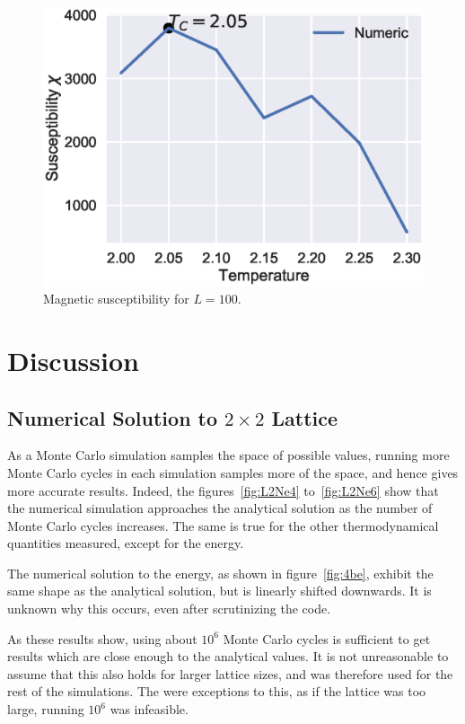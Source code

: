 \documentclass[aps,reprint]{revtex4-1}
\begin{document}
\begin{figure}[H]
  \centering
  \includegraphics[width=\columnwidth]{figures/L100sus.eps}
  \caption{\label{fig:100sus} Magnetic susceptibility for \(L=100\).}
\end{figure}

\section{Discussion}
\label{sec:discussion}

\subsection{Numerical Solution to $2\times 2$ Lattice}
As a Monte Carlo simulation samples the space of possible values, running more
Monte Carlo cycles in each simulation samples more of the space, and hence gives
more accurate results. Indeed, the figures~\ref{fig:L2Ne4} to~\ref{fig:L2Ne6}
show that the numerical simulation approaches the analytical solution as the
number of Monte Carlo cycles increases. The same is true for the other
thermodynamical quantities measured, except for the energy.

The numerical solution to the energy, as shown in figure~\ref{fig:4be}, exhibit
the same shape as the analytical solution, but is linearly shifted downwards. It
is unknown why this occurs, even after scrutinizing the code.

As these results show, using about \(10^{6}\) Monte Carlo cycles is sufficient
to get results which are close enough to the analytical values. It is not
unreasonable to assume that this also holds for larger lattice sizes, and was
therefore used for the rest of the simulations. The were exceptions to this, as
if the lattice was too large, running \(10^{6}\) was infeasible.
\end{document}
